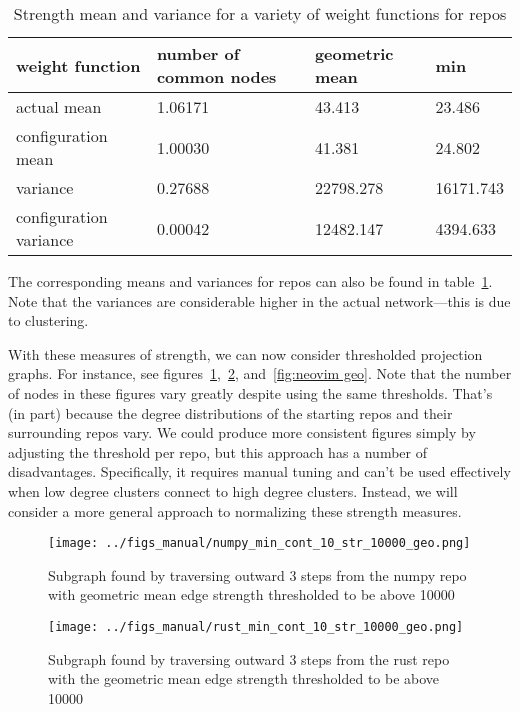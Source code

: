 \documentclass{pset}
\begin{document}
\begin{table}[ht]
\begin{tabular}{l|lll}
 weight function        & number of common nodes & geometric mean & min \\\hline
 actual mean            & 1.06171                & 43.413         & 23.486 \\\hline
 configuration mean     & 1.00030                & 41.381         & 24.802 \\\hline
 variance               & 0.27688                & 22798.278      & 16171.743 \\\hline
 configuration variance & 0.00042                & 12482.147      & 4394.633 \\\hline
\end{tabular}
    \caption{Strength mean and variance for a variety of weight functions for
    repos}\label{tab:mean var}
\end{table}

The corresponding means and variances for repos can also be found in
table~\ref{tab:mean var}.
Note that the variances are considerable higher in the actual network---this 
is due to clustering.

With these measures of strength, we can now consider thresholded projection
graphs. For instance, see figures~\ref{fig:numpy geo},~\ref{fig:rust geo}, 
and~\ref{fig:neovim geo}.
Note that the number of nodes in these figures vary greatly despite using
the same thresholds. That's (in part) because the degree distributions
of the starting repos and their surrounding repos vary.
We could produce more consistent figures simply by adjusting the threshold per
repo, but this approach has a number of disadvantages. Specifically,
it requires manual tuning and can't be used effectively when low degree
clusters connect to high degree clusters. Instead, we will
consider a more general approach to normalizing these strength measures.

\begin{figure}[ht]
\centering
\texttt{[image: ../figs\_manual/numpy\_min\_cont\_10\_str\_10000\_geo.png]}
\caption{Subgraph found by traversing outward 3 steps from the numpy repo with
geometric mean edge strength thresholded to be above 
10000}\label{fig:numpy geo}
\end{figure}

\begin{figure}[ht]
\centering
\texttt{[image: ../figs\_manual/rust\_min\_cont\_10\_str\_10000\_geo.png]}
\caption{Subgraph found by traversing outward 3 steps from the rust repo with
    the geometric mean edge strength thresholded to be above 10000}\label{fig:rust geo}
\end{figure}
\end{document}
